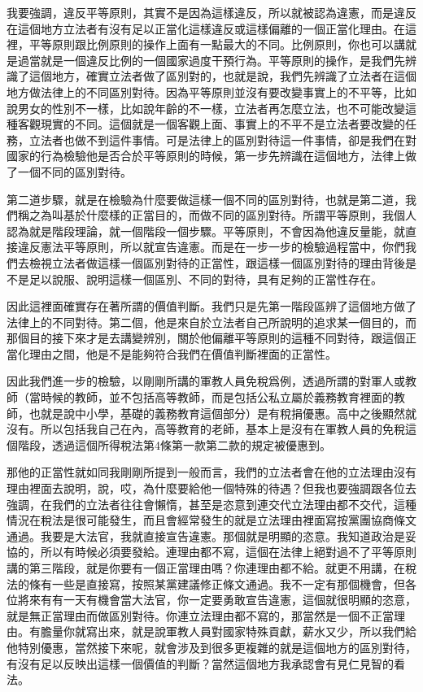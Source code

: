 \documentclass[oneside,sub3section]{ctexbook}
\begin{document}
我要強調，違反平等原則，其實不是因為這樣違反，所以就被認為違憲，而是違反在這個地方立法者有沒有足以正當化這樣違反或這樣偏離的一個正當化理由。在這裡，平等原則跟比例原則的操作上面有一點最大的不同。比例原則，你也可以講就是過當就是一個違反比例的一個國家過度干預行為。平等原則的操作，是我們先辨識了這個地方，確實立法者做了區別對的，也就是說，我們先辨識了立法者在這個地方做法律上的不同區別對待。因為平等原則並沒有要改變事實上的不平等，比如說男女的性別不一樣，比如說年齡的不一樣，立法者再怎麼立法，也不可能改變這種客觀現實的不同。這個就是一個客觀上面、事實上的不平不是立法者要改變的任務，立法者也做不到這件事情。可是法律上的區別對待這一件事情，卻是我們在對國家的行為檢驗他是否合於平等原則的時候，第一步先辨識在這個地方，法律上做了一個不同的區別對待。

第二道步驟，就是在檢驗為什麼要做這樣一個不同的區別對待，也就是第二道，我們稱之為叫基於什麼樣的正當目的，而做不同的區別對待。所謂平等原則，我個人認為就是階段理論，就一個階段一個步驟。平等原則，不會因為他違反量能，就直接違反憲法平等原則，所以就宣告違憲。而是在一步一步的檢驗過程當中，你們我們去檢視立法者做這樣一個區別對待的正當性，跟這樣一個區別對待的理由背後是不是足以說服、說明這樣一個區別、不同的對待，具有足夠的正當性存在。

因此這裡面確實存在著所謂的價值判斷。我們只是先第一階段區辨了這個地方做了法律上的不同對待。第二個，他是來自於立法者自己所說明的追求某一個目的，而那個目的接下來才是去講變辨別，關於他偏離平等原則的這種不同對待，跟這個正當化理由之間，他是不是能夠符合我們在價值判斷裡面的正當性。

因此我們進一步的檢驗，以剛剛所講的軍教人員免稅爲例，透過所謂的對軍人或教師（當時候的教師，並不包括高等教師，而是包括公私立屬於義務教育裡面的教師，也就是說中小學，基礎的義務教育這個部分）是有稅捐優惠。高中之後顯然就沒有。所以包括我自己在內，高等教育的老師，基本上是沒有在軍教人員的免稅這個階段，透過這個所得稅法第4條第一款第二款的規定被優惠到。

那他的正當性就如同我剛剛所提到一般而言，我們的立法者會在他的立法理由沒有理由裡面去說明，說，哎，為什麼要給他一個特殊的待遇？但我也要強調跟各位去強調，在我們的立法者往往會懶惰，甚至是恣意到連交代立法理由都不交代，這種情況在稅法是很可能發生，而且會經常發生的就是立法理由裡面寫按黨團協商條文通過。我要是大法官，我就直接宣告違憲。那個就是明顯的恣意。我知道政治是妥協的，所以有時候必須要發給。連理由都不寫，這個在法律上絕對過不了平等原則講的第三階段，就是你要有一個正當理由嗎？你連理由都不給。就更不用講，在稅法的條有一些是直接寫，按照某黨建議修正條文通過。我不一定有那個機會，但各位將來有有一天有機會當大法官，你一定要勇敢宣告違憲，這個就很明顯的恣意，就是無正當理由而做區別對待。你連立法理由都不寫的，那當然是一個不正當理由。有膽量你就寫出來，就是說軍教人員對國家特殊貢獻，薪水又少，所以我們給他特別優惠，當然接下來呢，就會涉及到很多更複雜的就是這個地方的區別對待，有沒有足以反映出這樣一個價值的判斷？當然這個地方我承認會有見仁見智的看法。
\end{document}
